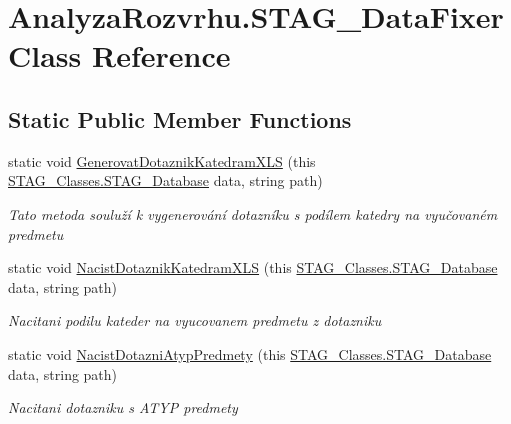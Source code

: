 \hypertarget{class_analyza_rozvrhu_1_1_s_t_a_g___data_fixer}{}\section{Analyza\+Rozvrhu.\+S\+T\+A\+G\+\_\+\+Data\+Fixer Class Reference}
\label{class_analyza_rozvrhu_1_1_s_t_a_g___data_fixer}
\subsection*{Static Public Member Functions}
\begin{DoxyCompactItemize}
\item 
static void \hyperlink{class_analyza_rozvrhu_1_1_s_t_a_g___data_fixer_ab241499d1fc1e784238f96afaafb6d64}{Generovat\+Dotaznik\+Katedram\+X\+LS} (this \hyperlink{class_analyza_rozvrhu_1_1_s_t_a_g___classes_1_1_s_t_a_g___database}{S\+T\+A\+G\+\_\+\+Classes.\+S\+T\+A\+G\+\_\+\+Database} data, string path)
\begin{DoxyCompactList}\small\item\em Tato metoda souluží k vygenerování dotazníku s podílem katedry na vyučovaném predmetu \end{DoxyCompactList}\item 
static void \hyperlink{class_analyza_rozvrhu_1_1_s_t_a_g___data_fixer_a95e49b86388051a61a284776d5d33cb1}{Nacist\+Dotaznik\+Katedram\+X\+LS} (this \hyperlink{class_analyza_rozvrhu_1_1_s_t_a_g___classes_1_1_s_t_a_g___database}{S\+T\+A\+G\+\_\+\+Classes.\+S\+T\+A\+G\+\_\+\+Database} data, string path)
\begin{DoxyCompactList}\small\item\em Nacitani podilu kateder na vyucovanem predmetu z dotazniku \end{DoxyCompactList}\item 
static void \hyperlink{class_analyza_rozvrhu_1_1_s_t_a_g___data_fixer_a4c8b2d577686823729f385f2e66999de}{Nacist\+Dotazni\+Atyp\+Predmety} (this \hyperlink{class_analyza_rozvrhu_1_1_s_t_a_g___classes_1_1_s_t_a_g___database}{S\+T\+A\+G\+\_\+\+Classes.\+S\+T\+A\+G\+\_\+\+Database} data, string path)
\begin{DoxyCompactList}\small\item\em Nacitani dotazniku s A\+T\+YP predmety \end{DoxyCompactList}\end{DoxyCompactItemize}


